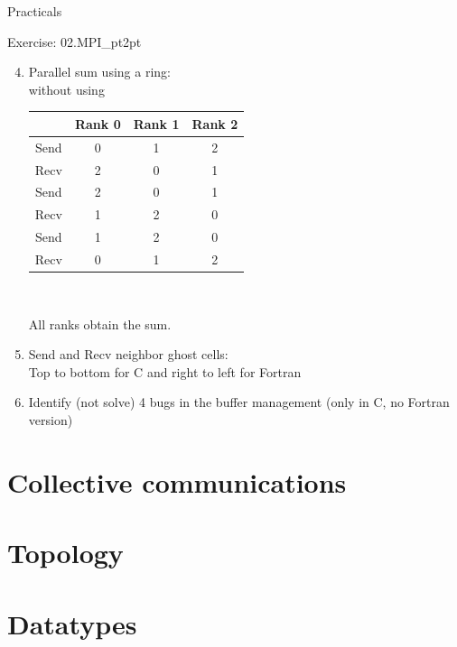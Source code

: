 \documentclass[aspectratio=43]{beamer}
\begin{document}
\begin{frame}[fragile]{Practicals}
    \begin{brown2block}{Exercise: 02.MPI\_pt2pt}
    \begin{enumerate}
        \setcounter{enumi}{3}
    \item Parallel sum using a ring:\\
        without using \\
        {{\small
            \begin{tabular}{|c||c|c|c|}\hline
                 & Rank 0 & Rank 1 & Rank 2\\\hline
            Send & 0 & 1 & 2 \\\hline
            Recv & 2 & 0 & 1 \\\hline\hline
            Send & 2 & 0 & 1 \\\hline
            Recv & 1 & 2 & 0 \\\hline\hline
            Send & 1 & 2 & 0 \\\hline
            Recv & 0 & 1 & 2 \\\hline
            \end{tabular}\\}}
        All ranks obtain the sum.
        \item Send and Recv neighbor ghost cells:\\
            Top to bottom for C and right to left for Fortran
        \item Identify (not solve) 4 bugs in the buffer management (only in C, no Fortran version)
    \end{enumerate}
    \end{brown2block}
\end{frame}

\section{Collective communications}
\section{Topology}
\section{Datatypes}

\end{document}
